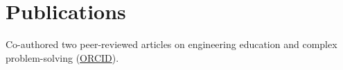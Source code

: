 \section{Publications}

Co-authored two peer-reviewed articles on engineering education and complex problem-solving
(\href{https://orcid.org/\myorcid}{ORCID}).
